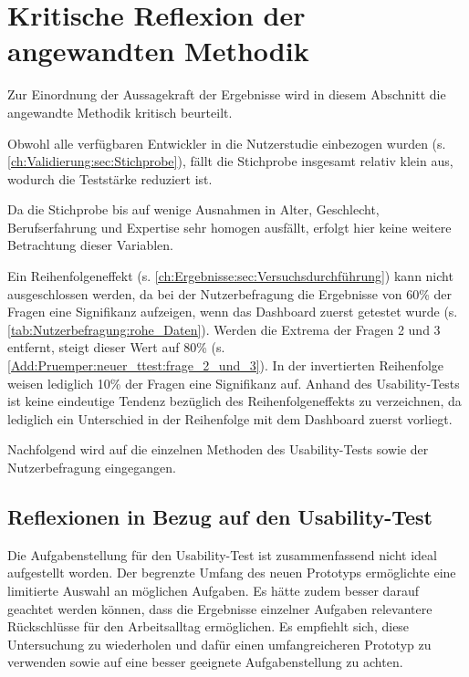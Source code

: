 \section{Kritische Reflexion der angewandten Methodik}
\label{ch:Diskussion:Methodenkritik}

Zur Einordnung der Aussagekraft der Ergebnisse wird in diesem Abschnitt die angewandte Methodik kritisch beurteilt.

Obwohl alle verfügbaren Entwickler in die Nutzerstudie einbezogen wurden (s. \autoref{ch:Validierung:sec:Stichprobe}), fällt die Stichprobe insgesamt relativ klein aus, wodurch die Teststärke reduziert ist.

Da die Stichprobe bis auf wenige Ausnahmen in Alter, Geschlecht, Berufserfahrung und Expertise sehr homogen ausfällt, erfolgt hier keine weitere Betrachtung dieser Variablen.

Ein Reihenfolgeneffekt (s. \autoref{ch:Ergebnisse:sec:Versuchsdurchführung}) kann nicht ausgeschlossen werden, da bei der Nutzerbefragung die Ergebnisse von 60\% der Fragen eine Signifikanz aufzeigen, wenn das Dash\-board zuerst getestet wurde (s. \autoref{tab:Nutzerbefragung:rohe_Daten}). Werden die Extrema der Fragen 2 und 3  entfernt, steigt dieser Wert auf 80\% (s. \autoref{Add:Pruemper:neuer_ttest:frage_2_und_3}). In der invertierten Reihenfolge weisen lediglich 10\% der Fragen eine Signifikanz auf. Anhand des Usability-Tests ist keine eindeutige Tendenz bezüglich des Reihenfolgeneffekts zu verzeichnen, da lediglich ein Unterschied in der Reihenfolge mit dem Dash\-board zuerst vorliegt.

Nachfolgend wird auf die einzelnen Methoden des Usability-Tests sowie der Nutzerbefragung eingegangen.

\subsection{Reflexionen in Bezug auf den Usability-Test}
\label{ch:Diskussion:}

Die Aufgabenstellung für den Usability-Test ist zusammenfassend nicht ideal aufgestellt worden. Der begrenzte Umfang des neuen Prototyps ermöglichte eine limitierte Auswahl an möglichen Aufgaben. Es hätte zudem besser darauf geachtet werden können, dass die Ergebnisse einzelner Aufgaben relevantere Rückschlüsse für den Arbeitsalltag ermöglichen.
Es empfiehlt sich, diese Untersuchung zu wiederholen und dafür einen umfangreicheren Prototyp zu verwenden sowie auf eine besser geeignete Aufgabenstellung zu achten.


